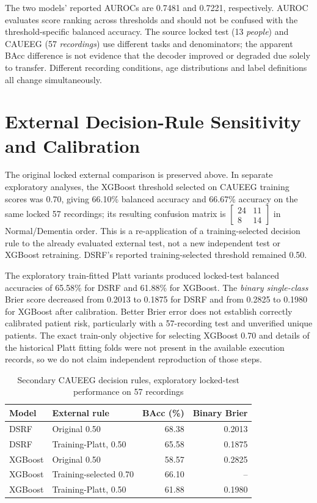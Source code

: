 The two models' reported AUROCs are 0.7481 and 0.7221, respectively. AUROC evaluates score ranking across thresholds and should not be confused with the threshold-specific balanced accuracy. The source locked test (13 \emph{people}) and CAUEEG (57 \emph{recordings}) use different tasks and denominators; the apparent BAcc difference is not evidence that the decoder improved or degraded due solely to transfer. Different recording conditions, age distributions and label definitions all change simultaneously.

\section{External Decision-Rule Sensitivity and Calibration}
The original locked external comparison is preserved above. In separate exploratory analyses, the XGBoost threshold selected on CAUEEG training scores was 0.70, giving 66.10\% balanced accuracy and 66.67\% accuracy on the same locked 57 recordings; its resulting confusion matrix is $\left[\begin{smallmatrix}24&11\\8&14\end{smallmatrix}\right]$ in Normal/Dementia order. This is a re-application of a training-selected decision rule to the already evaluated external test, not a new independent test or XGBoost retraining. DSRF's reported training-selected threshold remained 0.50.

The exploratory train-fitted Platt variants produced locked-test balanced accuracies of 65.58\% for DSRF and 61.88\% for XGBoost. The \emph{binary single-class} Brier score decreased from 0.2013 to 0.1875 for DSRF and from 0.2825 to 0.1980 for XGBoost after calibration. Better Brier error does not establish correctly calibrated patient risk, particularly with a 57-recording test and unverified unique patients. The exact train-only objective for selecting XGBoost 0.70 and details of the historical Platt fitting folds were not present in the available execution records, so we do not claim independent reproduction of those steps.

\begin{table}[!htbp]\centering\small
\caption{Secondary CAUEEG decision rules, exploratory locked-test performance on 57 recordings}\label{tab:caueeg-secondary}
\begin{tabular}{@{}llrr@{}}\toprule
\textbf{Model}&\textbf{External rule}&\textbf{BAcc (\%)}&\textbf{Binary Brier}\\\midrule
DSRF&Original 0.50&68.38&0.2013\\
DSRF&Training-Platt, 0.50&65.58&0.1875\\
XGBoost&Original 0.50&58.57&0.2825\\
XGBoost&Training-selected 0.70&66.10&--\\
XGBoost&Training-Platt, 0.50&61.88&0.1980\\\bottomrule
\end{tabular}\end{table}

